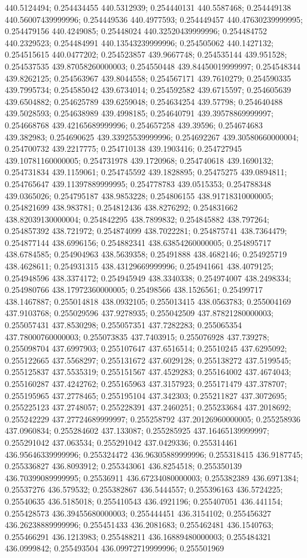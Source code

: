 440.5124494; 0.254434455 440.5312939; 0.254440131 440.5587468; 0.254449138 440.56007439999996; 0.254449536 440.4977593; 0.254449457 440.47630239999995; 0.254479156 440.4249085; 0.25448024 440.32520439999996; 0.254484752 440.2329523; 0.254484991 440.13543239999996; 0.254505062 440.1427132; 0.254515615 440.0477202; 0.254523857 439.9667748; 0.254535144 439.951528; 0.254537535 439.87058260000003; 0.254550448 439.84450019999997; 0.254548344 439.8262125; 0.254563967 439.8044558; 0.254567171 439.7610279; 0.254590335 439.7995734; 0.254585042 439.6734014; 0.254592582 439.6715597; 0.254605639 439.6504882; 0.254625789 439.6259048; 0.254634254 439.57798; 0.254640488 439.5028593; 0.254638989 439.4998185; 0.254640791 439.39578869999997; 0.254668768 439.42165689999996; 0.254657258 439.39596; 0.254674683 439.382983; 0.254690625 439.33925539999996; 0.254692267 439.30580660000004; 0.254700732 439.2217775; 0.254710138 439.1903416; 0.254727945 439.10781160000005; 0.254731978 439.1720968; 0.254740618 439.1690132; 0.254731834 439.1159061; 0.254745592 439.1828895; 0.25475275 439.0894811; 0.254765647 439.11397889999995; 0.254778783 439.0515353; 0.254788348 439.0365026; 0.254795187 438.9853228; 0.254806155 438.91718310000005; 0.254821699 438.983781; 0.254812436 438.8276292; 0.254831662 438.82039130000004; 0.254842295 438.7899832; 0.254845882 438.797264; 0.254857392 438.721972; 0.254874099 438.7022281; 0.254875741 438.7364479; 0.254877144 438.6996156; 0.254882341 438.63854260000005; 0.254895717 438.6784585; 0.254904963 438.5639358; 0.25491888 438.4682146; 0.254925719 438.4628611; 0.254931315 438.43129669999996; 0.254941661 438.4079125; 0.254948596 438.3374172; 0.254945949 438.3340338; 0.254974007 438.2498334; 0.254980766 438.17972360000005; 0.25498566 438.1526561; 0.25499717 438.1467887; 0.255014818 438.0932105; 0.255013415 438.0563783; 0.255004169 437.9103768; 0.255029596 437.9278935; 0.255042509 437.87821280000003; 0.255057431 437.8530298; 0.255057351 437.7282283; 0.255065354 437.78000760000003; 0.255073835 437.7403915; 0.255076928 437.739278; 0.255098704 437.6997903; 0.255107647 437.6516514; 0.25510245 437.6295092; 0.255122665 437.5568297; 0.255131672 437.6029128; 0.255138272 437.5199545; 0.255125837 437.5535319; 0.255151567 437.4529283; 0.255164002 437.4674043; 0.255160287 437.4242762; 0.255165963 437.3157923; 0.255171479 437.378707; 0.255195965 437.2778465; 0.255195104 437.342303; 0.255211827 437.3072695; 0.255225123 437.2748057; 0.255228391 437.2460251; 0.255233684 437.2018692; 0.255242229 437.27724689999997; 0.255258792 437.20126960000005; 0.255258936 437.0960834; 0.255284602 437.133087; 0.255285925 437.16465139999997; 0.255291042 437.063534; 0.255291042 437.0429336; 0.255314461 436.95646339999996; 0.255324472 436.96305889999996; 0.255318415 436.9187745; 0.255336827 436.8093912; 0.255343061 436.8254518; 0.255350139 436.70399089999995; 0.25536911 436.67234080000003; 0.255382389 436.6971384; 0.25537276 436.579532; 0.255382867 436.5444557; 0.255396163 436.5724225; 0.25540635 436.5185018; 0.255410543 436.4921196; 0.255407051 436.441154; 0.255428573 436.39455680000003; 0.255444451 436.3154102; 0.255456327 436.26238889999996; 0.255451433 436.2081683; 0.255462481 436.1540763; 0.255466291 436.1213983; 0.255488211 436.16889480000003; 0.255484321 436.0999842; 0.255493504 436.09972719999996; 0.255501969 